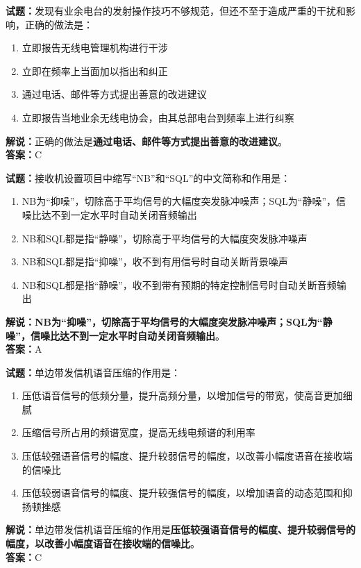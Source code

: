 \documentclass{ctexbook}
\begin{document}
\bigskip


\noindent\textbf{试题：}发现有业余电台的发射操作技巧不够规范，但还不至于造成严重的干扰和影响，正确的做法是：
\begin{enumerate}[leftmargin=3em]
\item 立即报告无线电管理机构进行干涉
\item 立即在频率上当面加以指出和纠正
\item 通过电话、邮件等方式提出善意的改进建议
\item 立即报告当地业余无线电协会，由其总部电台到频率上进行纠察
\end{enumerate}
\noindent\textbf{解说：}正确的做法是\textbf{通过电话、邮件等方式提出善意的改进建议}。\\\noindent\textbf{答案：}C


\bigskip


\noindent\textbf{试题：}接收机设置项目中缩写“NB”和“SQL”的中文简称和作用是：
\begin{enumerate}[leftmargin=3em]
\item NB为“抑噪”，切除高于平均信号的大幅度突发脉冲噪声；SQL为“静噪”，信噪比达不到一定水平时自动关闭音频输出
\item NB和SQL都是指“静噪”，切除高于平均信号的大幅度突发脉冲噪声
\item NB和SQL都是指“抑噪”，收不到有用信号时自动关断背景噪声
\item NB和SQL都是指“静噪”，收不到带有预期的特定控制信号时自动关断音频输出
\end{enumerate}
\noindent\textbf{解说：}\textbf{NB为“抑噪”，切除高于平均信号的大幅度突发脉冲噪声；SQL为“静噪”，信噪比达不到一定水平时自动关闭音频输出}。\\\noindent\textbf{答案：}A


\bigskip


\noindent\textbf{试题：}单边带发信机语音压缩的作用是：
\begin{enumerate}[leftmargin=3em]
\item 压低语音信号的低频分量，提升高频分量，以增加信号的带宽，使高音更加细腻
\item 压缩信号所占用的频谱宽度，提高无线电频谱的利用率
\item 压低较强语音信号的幅度、提升较弱信号的幅度，以改善小幅度语音在接收端的信噪比
\item 压低较弱语音信号的幅度、提升较强信号的幅度，以增加语音的动态范围和抑扬顿挫感
\end{enumerate}
\noindent\textbf{解说：}单边带发信机语音压缩的作用是\textbf{压低较强语音信号的幅度、提升较弱信号的幅度，以改善小幅度语音在接收端的信噪比}。\\\noindent\textbf{答案：}C
\end{document}
